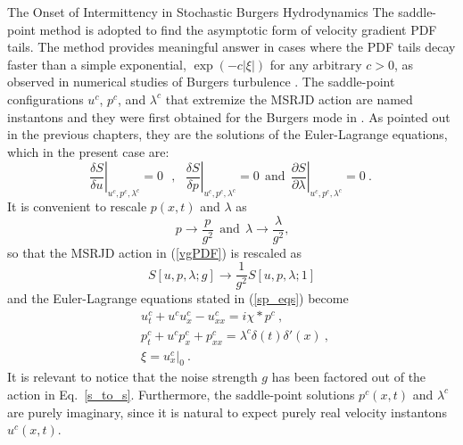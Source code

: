 \begin{chapter}{The Onset of Intermittency in Stochastic Burgers Hydrodynamics}
The saddle-point method is adopted to find the asymptotic form of velocity gradient PDF tails. The method provides meaningful answer in cases where the PDF tails decay faster than a simple exponential, $\exp(-c|\xi|)$ for any arbitrary $c>0$, as observed in numerical studies of Burgers turbulence \textcite{gotoh1998}.
The saddle-point configurations $u^c$, $p^c$, and $\lambda^c$ that extremize the MSRJD action are named instantons and they were first obtained for the Burgers mode in \textcite{gurarie1996, falkovich1996}.
As pointed out in the previous chapters, they are the solutions of the Euler-Lagrange equations, which in the present case are:
\begin{equation}
 \left. \frac{\delta S}{\delta u}\right\vert_{u^c,p^c,\lambda^c} \!\!\!\!\!\!\! =0
 \ \ \ , \ \ \
 \left.\frac{\delta S}{\delta p}\right\vert_{u^c,p^c, \lambda^c} \!\!\!\!\!\!\! =0
  \ \ \mbox{and} \ \
 \left.\frac{\partial S}{\partial \lambda }\right\vert_{u^c,p^c, \lambda^c} \!\!\!\!\!\!\! =0   \ . \ \label{sp_eqs}
\end{equation}
It is convenient to rescale $p(x,t)$ and $\lambda$ as
\begin{equation}
    p \rightarrow \frac{p}{g^2} \ \ \mbox{and} \ \
    \lambda \rightarrow \frac{\lambda}{g^2} \mbox{,} \label{rescaling}
\end{equation}
so that the MSRJD action in (\ref{vgPDF}) is rescaled as
\begin{equation}
S[u,p,\lambda;g] \rightarrow \frac{1}{g^2} S[u, p, \lambda; 1]  \label{s_to_s}
\end{equation}
and the Euler-Lagrange equations stated in (\ref{sp_eqs}) become
\begin{subequations}
\begin{align}
 &u_t^c + u^c u_x^c - u^c_{xx} = i\chi * p^c \ , \ \label{sp1} \\
 &p^c_t+ u^c p^c_x + p^c_{xx} = \lambda^c \delta(t) \delta'(x) \label{sp2} \ , \ \\
 &\xi = u^c_x|_0 \label{sp3} \ . \
\end{align}
\end{subequations}
It is relevant to notice that the noise strength $g$ has been factored out of the action in Eq.~\eqref{s_to_s}. Furthermore, the saddle-point solutions $p^c(x,t)$ and $\lambda^c$ are purely imaginary, since it is natural to expect purely real velocity instantons $u^c(x,t)$.


\end{chapter}
